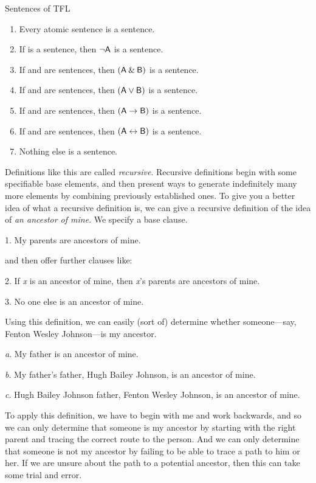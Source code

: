 \begin{factboxy2}{Sentences of TFL}\label{TFLsentences}
	\begin{enumerate}
		\item Every atomic sentence is a sentence.
		\item If  is a sentence, then ${\neg}\mathsf{A}$ is a sentence.
		\item If  and  are sentences, then $(\mathsf{A}\mathbin{\&}\mathsf{B})$ is a sentence.
		\item If  and  are sentences, then $(\mathsf{A}\vee\mathsf{B})$ is a sentence.
		\item If  and  are sentences, then $(\mathsf{A}\rightarrow\mathsf{B})$ is a sentence.
		\item If  and  are sentences, then $(\mathsf{A}\leftrightarrow\mathsf{B})$ is a sentence.
		\item Nothing else is a sentence.
	\end{enumerate}
\end{factboxy2}

Definitions like this are called \emph{recursive}. Recursive definitions begin with some specifiable base elements, and then present ways to generate indefinitely many more elements by combining previously established ones. To give you a better idea of what a recursive definition is, we can give a recursive definition of the idea of \emph{an ancestor of mine}. We specify a base clause.
	\begin{ebullet}
		\item[1.] My parents are ancestors of mine.
	\end{ebullet}
and then offer further clauses like:
	\begin{ebullet}
		\item[2.] If \textit{x} is an ancestor of mine, then \textit{x}'s parents are ancestors of mine.
		\item[3.] No one else is an ancestor of mine.
	\end{ebullet}
Using this definition, we can easily (sort of) determine whether someone---say, Fenton Wesley Johnson---is my ancestor. 
	\begin{ebullet}
		\item[\textit{a}.] My father is an ancestor of mine. 
		\item[\textit{b}.] My father's father, Hugh Bailey Johnson, is an ancestor of mine. 
		\item[\textit{c}.] Hugh Bailey Johnson father, Fenton Wesley Johnson, is an ancestor of mine. 
	\end{ebullet}
To apply this definition, we have to begin with me and work backwards, and so we can only determine that someone is my ancestor by starting with the right parent and tracing the correct route to the person. And we can only determine that someone is not my ancestor by failing to be able to trace a path to him or her. If we are unsure about the path to a potential ancestor, then this can take some trial and error. 

